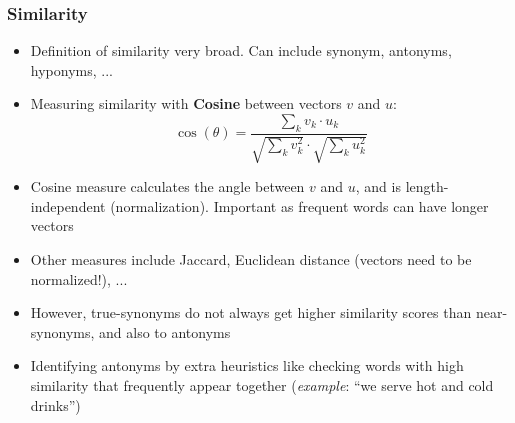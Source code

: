 \subsubsection{Similarity}
\begin{itemize}
	\item Definition of similarity very broad. Can include synonym, antonyms, hyponyms, ...
	\item Measuring similarity with \textbf{Cosine} between vectors $v$ and $u$:
	$$\cos\left(\theta\right) = \frac{\sum_k v_k \cdot u_k}{\sqrt{\sum_k v_k^2} \cdot \sqrt{\sum_k u_k^2}}$$
	\item Cosine measure calculates the angle between $v$ and $u$, and is length-independent (normalization). Important as frequent words can have longer vectors
	\item Other measures include Jaccard, Euclidean distance (vectors need to be normalized!), ...
	\item However, true-synonyms do not always get higher similarity scores than near-synonyms, and also to antonyms
	\item Identifying antonyms by extra heuristics like checking words with high similarity that frequently appear together (\textit{example}: ``we serve hot and cold drinks'')
	
\end{itemize}
